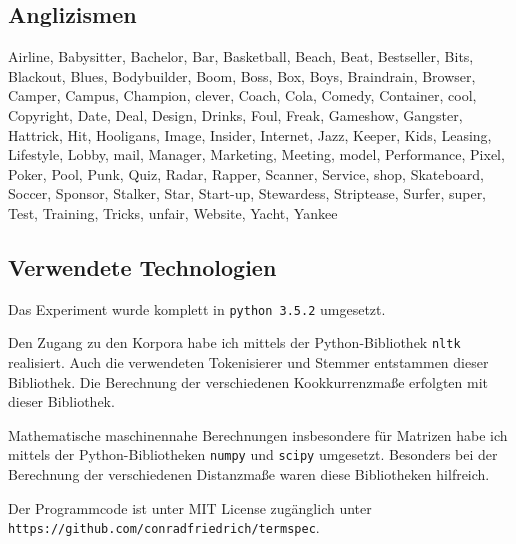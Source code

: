 \documentclass[11pt,numbers=noenddot]{scrartcl}
\begin{document}
\subsection{Anglizismen}

Airline, Babysitter, Bachelor, Bar, Basketball, Beach, Beat, Bestseller, Bits, Blackout, Blues, Bodybuilder, Boom, Boss, Box, Boys, Braindrain, Browser, Camper, Campus, Champion, clever, Coach, Cola, Comedy, Container, cool, Copyright, Date, Deal, Design, Drinks, Foul, Freak, Gameshow, Gangster, Hattrick, Hit, Hooligans, Image, Insider, Internet, Jazz, Keeper, Kids, Leasing, Lifestyle, Lobby, mail, Manager, Marketing, Meeting, model, Performance, Pixel, Poker, Pool, Punk, Quiz, Radar, Rapper, Scanner, Service, shop, Skateboard, Soccer, Sponsor, Stalker, Star, Start-up, Stewardess, Striptease, Surfer, super, Test, Training, Tricks, unfair, Website, Yacht, Yankee

\subsection{Verwendete Technologien}

Das Experiment wurde komplett in \texttt{python 3.5.2} umgesetzt.

Den Zugang zu den Korpora habe ich mittels der Python-Bibliothek \texttt{nltk} realisiert. Auch die verwendeten Tokenisierer und Stemmer entstammen dieser Bibliothek. Die Berechnung der verschiedenen Kookkurrenzmaße erfolgten mit dieser Bibliothek.

Mathematische maschinennahe Berechnungen insbesondere für Matrizen habe ich mittels der Python-Bibliotheken 
\texttt{numpy} und \texttt{scipy} umgesetzt. Besonders bei der Berechnung der verschiedenen Distanzmaße waren diese Bibliotheken hilfreich.

Der Programmcode ist unter MIT License zugänglich unter \\ \texttt{https://github.com/conradfriedrich/termspec}.


\nocite{han2011}
\nocite{heyer2008}
\nocite{manning1999}
\end{document}
